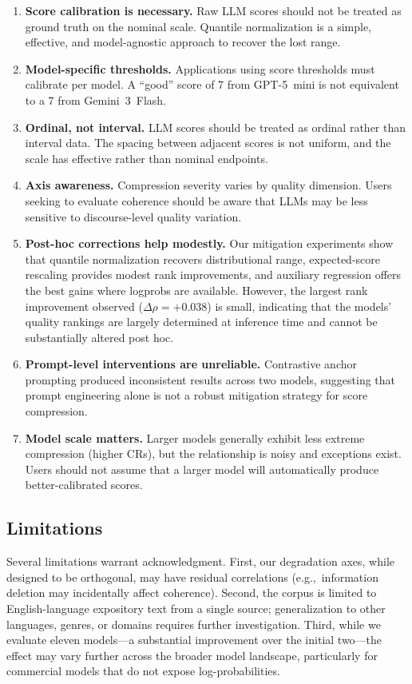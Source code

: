 \documentclass[11pt]{article}
\newcommand{\eg}{e.g.,\ }
\begin{document}
\begin{enumerate}[nosep]
    \item \textbf{Score calibration is necessary.} Raw LLM scores should not be treated as ground truth on the nominal scale. Quantile normalization is a simple, effective, and model-agnostic approach to recover the lost range.
    \item \textbf{Model-specific thresholds.} Applications using score thresholds must calibrate per model. A ``good'' score of 7 from GPT-5~mini is not equivalent to a 7 from Gemini~3~Flash.
    \item \textbf{Ordinal, not interval.} LLM scores should be treated as ordinal rather than interval data. The spacing between adjacent scores is not uniform, and the scale has effective rather than nominal endpoints.
    \item \textbf{Axis awareness.} Compression severity varies by quality dimension. Users seeking to evaluate coherence should be aware that LLMs may be less sensitive to discourse-level quality variation.
    \item \textbf{Post-hoc corrections help modestly.} Our mitigation experiments show that quantile normalization recovers distributional range, expected-score rescaling provides modest rank improvements, and auxiliary regression offers the best gains where logprobs are available. However, the largest rank improvement observed ($\Delta\rho = +0.038$) is small, indicating that the models' quality rankings are largely determined at inference time and cannot be substantially altered post hoc.
    \item \textbf{Prompt-level interventions are unreliable.} Contrastive anchor prompting produced inconsistent results across two models, suggesting that prompt engineering alone is not a robust mitigation strategy for score compression.
    \item \textbf{Model scale matters.} Larger models generally exhibit less extreme compression (higher CRs), but the relationship is noisy and exceptions exist. Users should not assume that a larger model will automatically produce better-calibrated scores.
\end{enumerate}

\subsection{Limitations}

Several limitations warrant acknowledgment. First, our degradation axes, while designed to be orthogonal, may have residual correlations (\eg information deletion may incidentally affect coherence). Second, the corpus is limited to English-language expository text from a single source; generalization to other languages, genres, or domains requires further investigation. Third, while we evaluate eleven models---a substantial improvement over the initial two---the effect may vary further across the broader model landscape, particularly for commercial models that do not expose log-probabilities.
\end{document}
